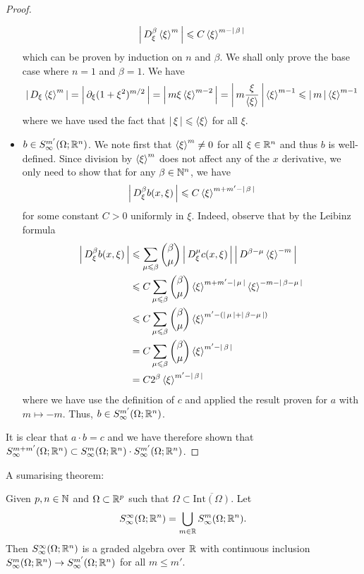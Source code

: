 \documentclass[12pt]{article}
\begin{document}
\begin{proof}
\begin{itemize}
        \[
        \abs{D^\beta_\xi \sym[\xi]^m} \leq C \sym[\xi]^{m - \abs{\beta}}
        \]
        which can be proven by induction on $n$ and $\beta$. We shall only prove the base case where $n = 1$ and $\beta = 1$. We have 
        \begin{align*}
        \abs{D_\xi \sym[\xi]^m} = \abs{\p_\xi (1 + \xi^2)^{m/2}} = \abs{m\xi \sym[\xi]^{m - 2}} = \abs{m \frac{\xi}{\sym[\xi]}} \sym[\xi]^{m - 1} \leq \abs{m} \sym[\xi]^{m - 1}
        \end{align*}
        where we have used the fact that $\abs{\xi} \leq \sym[\xi]$ for all $\xi$. 
        \item $b \in S^{m'}_\infty(\Omega; \R^n)$. We note first that $\sym[\xi]^m \neq 0$ for all $\xi \in \R^n$ and thus $b$ is well-defined. Since division by $\sym[\xi]^m$ does not affect any of the $x$ derivative, we only need to show that for any $\beta \in \N^n$, we have
        \[
        \abs{D^\beta_\xi b(x, \xi)} \leq C \sym[\xi]^{m + m' - \abs{\beta}}
        \]
        for some constant $C > 0$ uniformly in $\xi$. Indeed, observe that by the Leibinz formula
        \begin{align*}
        \abs{D^\beta_\xi b(x, \xi)} 
        & \leq \sum_{\mu \leq \beta} \binom{\beta}{\mu} \abs{D^\mu_\xi c(x, \xi)} \abs{D^{\beta - \mu} \sym[\xi]^{-m}} \\
        & \leq C \sum_{\mu \leq \beta} \binom{\beta}{\mu} \sym[\xi]^{m + m' - \abs{\mu}} \sym[\xi]^{-m - \abs{\beta - \mu}} \\
        & \leq C \sum_{\mu \leq \beta} \binom{\beta}{\mu} \sym[\xi]^{ m' - (\abs{\mu} +  \abs{\beta - \mu})} \\
        & = C \sum_{\mu \leq \beta} \binom{\beta}{\mu} \sym[\xi]^{ m' -\abs{\beta}} \\
        &= C 2^{\beta} \sym[\xi]^{ m' -\abs{\beta}} 
        \end{align*}
        where we have use the definition of $c$ and applied the result proven for $a$ with $m \mapsto -m$. Thus, $b \in S^{m'}_\infty(\Omega; \R^n)$. 
    \end{itemize}
It is clear that $a \cdot b = c$ and we have therefore shown that $S^{m + m'}_\infty(\Omega; \R^n) \subset S^{m}_\infty(\Omega; \R^n) \cdot S^{m'}_\infty(\Omega; \R^n)$. 


    
\end{proof}

A sumarising theorem: 
\begin{ftheorem}
    Given $p, n \in \N$ and $\Omega \subset \R^p$ such that $\Omega \subset \overline{\mathrm{Int}(\Omega)}$. Let 
    \[
    S^\infty_\infty(\Omega; \R^n) = \bigcup_{m \in \R} S^m_\infty(\Omega; \R^n). 
    \]
    Then $S^\infty_\infty(\Omega; \R^n)$ is a graded algebra over $\R$ with continuous  inclusion  $S^{m}_\infty(\Omega; \R^n) \to S^{m'}_\infty(\Omega; \R^n)$ for all $m \leq m'$. 
\end{ftheorem}
\end{document}
